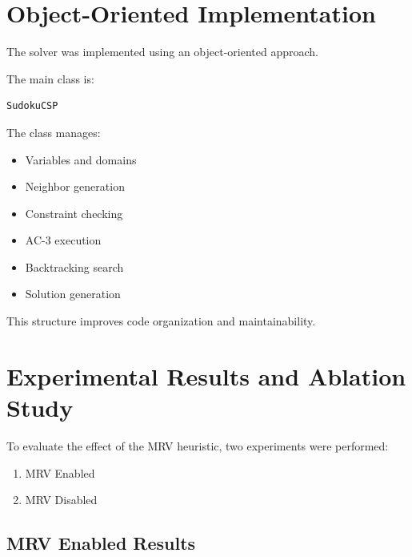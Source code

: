 \documentclass[12pt,a4paper]{article}
\begin{document}
\section{Object-Oriented Implementation}


The solver was implemented using an object-oriented approach.


The main class is:


\begin{verbatim}
SudokuCSP
\end{verbatim}


The class manages:


\begin{itemize}

\item Variables and domains

\item Neighbor generation

\item Constraint checking

\item AC-3 execution

\item Backtracking search

\item Solution generation

\end{itemize}


This structure improves code organization and maintainability.




\section{Experimental Results and Ablation Study}


To evaluate the effect of the MRV heuristic, two experiments were performed:


\begin{enumerate}

\item MRV Enabled

\item MRV Disabled

\end{enumerate}




\subsection{MRV Enabled Results}
\end{document}
